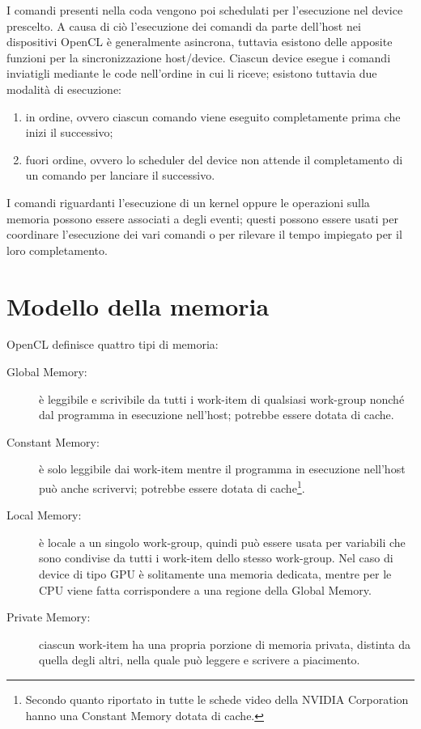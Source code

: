 \documentclass[12pt,a4paper,oneside]{book}
\begin{document}
I comandi presenti nella coda vengono poi schedulati per l'esecuzione nel device prescelto. A causa di ciò l'esecuzione dei comandi da parte dell'host nei dispositivi \ac{OpenCL} è generalmente asincrona, tuttavia esistono delle apposite funzioni per la sincronizzazione host/device. Ciascun device esegue i comandi inviatigli mediante le code nell'ordine in cui li riceve; esistono tuttavia due modalità di esecuzione:
\begin{enumerate}
\item in ordine, ovvero ciascun comando viene eseguito completamente prima che inizi il successivo;
\item fuori ordine, ovvero lo scheduler del device non attende il completamento di un comando per lanciare il successivo.
\end{enumerate}

I comandi riguardanti l'esecuzione di un kernel oppure le operazioni sulla memoria possono essere associati a degli eventi\label{pag:opencl-event}; questi possono essere usati per coordinare l'esecuzione dei vari comandi o per rilevare il tempo impiegato per il loro completamento.

\section{Modello della memoria}
\label{sec:opencl-memory}

\ac{OpenCL} definisce quattro tipi di memoria:
\begin{description}
\item[Global Memory:] è leggibile e scrivibile da tutti i work-item di qualsiasi work-group nonché dal programma in esecuzione nell'host; potrebbe essere dotata di cache.
\item[Constant Memory:] è solo leggibile dai work-item mentre il programma in esecuzione nell'host può anche scrivervi; potrebbe essere dotata di cache\footnote{Secondo quanto riportato in \cite{bib:nvidia} tutte le schede video della NVIDIA Corporation hanno una Constant Memory dotata di cache.}.
\item[Local Memory:] è locale a un singolo work-group, quindi può essere usata per variabili che sono condivise da tutti i work-item dello stesso work-group. Nel caso di device di tipo \ac{GPU} è solitamente una memoria dedicata, mentre per le \ac{CPU} viene fatta corrispondere a una regione della Global Memory.
\item[Private Memory:] ciascun work-item ha una propria porzione di memoria privata, distinta da quella degli altri, nella quale può leggere e scrivere a piacimento.
\end{description}
\end{document}
